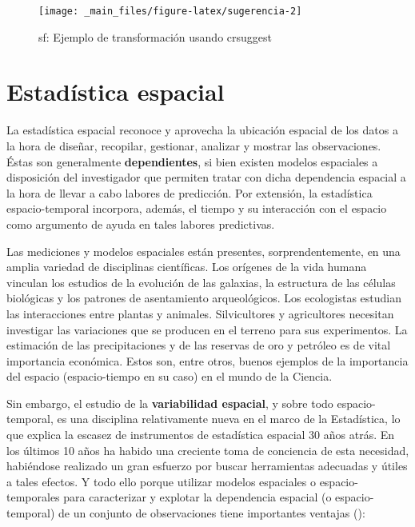 \documentclass[
]{report}
\begin{document}
\begin{figure}

{\centering \texttt{[image: \_main\_files/figure-latex/sugerencia-2]} 

}

\caption{sf: Ejemplo de transformación usando crsuggest}\label{fig:sugerencia-2}
\end{figure}

\hypertarget{estaduxedstica-espacial}{%
\chapter{Estadística espacial}\label{estaduxedstica-espacial}}

La estadística espacial reconoce y aprovecha la ubicación espacial de los datos
a la hora de diseñar, recopilar, gestionar, analizar y mostrar las
observaciones. Éstas son generalmente \textbf{dependientes}, si bien existen modelos
espaciales a disposición del investigador que permiten tratar con dicha
dependencia espacial a la hora de llevar a cabo labores de predicción. Por
extensión, la estadística espacio-temporal incorpora, además, el tiempo y su
interacción con el espacio como argumento de ayuda en tales labores predictivas.

Las mediciones y modelos espaciales están presentes, sorprendentemente, en una
amplia variedad de disciplinas científicas. Los orígenes de la vida humana
vinculan los estudios de la evolución de las galaxias, la estructura de las
células biológicas y los patrones de asentamiento arqueológicos. Los ecologistas
estudian las interacciones entre plantas y animales. Silvicultores y
agricultores necesitan investigar las variaciones que se producen en el terreno
para sus experimentos. La estimación de las precipitaciones y de las reservas de
oro y petróleo es de vital importancia económica. Estos son, entre otros, buenos
ejemplos de la importancia del espacio (espacio-tiempo en su caso) en el mundo
de la Ciencia.

Sin embargo, el estudio de la \textbf{variabilidad espacial}, y sobre todo
espacio-temporal, es una disciplina relativamente nueva en el marco de la
Estadística, lo que explica la escasez de instrumentos de estadística espacial
30 años atrás. En los últimos 10 años ha habido una creciente toma de conciencia
de esta necesidad, habiéndose realizado un gran esfuerzo por buscar herramientas
adecuadas y útiles a tales efectos. Y todo ello porque utilizar modelos
espaciales o espacio-temporales para caracterizar y explotar la dependencia
espacial (o espacio-temporal) de un conjunto de observaciones tiene importantes
ventajas (\citet{montero_el_al_2011}):
\end{document}
